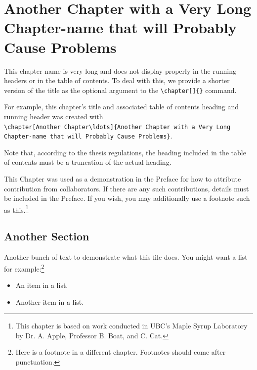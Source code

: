 \documentclass[msc,oneside]{ubcthesis}
\theoremstyle{definition}
\begin{document}
\newpage

\chapter[Another Chapter\ldots]{Another Chapter with a Very Long
  Chapter-name that will Probably Cause Problems}
\label{cha:apple_ref}

This chapter name is very long and does not display properly in the
running headers or in the table of contents.  To deal with this, we
provide a shorter version of the title as the optional argument to the
\verb|\chapter[]{}| command.

For example, this chapter's title and associated table of contents heading and
running header was created with\\
\verb|\chapter[Another Chapter\ldots]{Another Chapter with a Very Long|\\
\verb|Chapter-name that will Probably Cause Problems}|.

Note that, according to the thesis regulations, the heading included
in the table of contents must be a truncation of the actual heading.

This Chapter was used as a demonstration in the Preface for how to
attribute contribution from collaborators.  If there are any such
contributions, details must be included in the Preface.  If you wish,
you may additionally use a footnote such as this.\footnote{This
  chapter is based on work conducted in UBC's Maple Syrup Laboratory
  by Dr. A. Apple, Professor B. Boat, and C. Cat.}

\section{Another Section}
Another bunch of text to demonstrate what this file does.
You might want a list for example:\footnote{Here is a footnote in a
  different chapter.  Footnotes should come after punctuation.}
\begin{itemize}
\item An item in a list.
\item Another item in a list.
\end{itemize}
\end{document}
